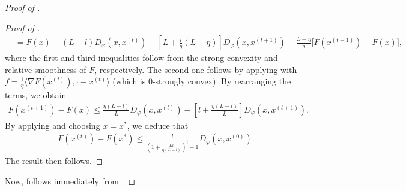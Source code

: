 \begin{proof}[Proof of ]
\begin{proof}[Proof of ]
\begin{align}
    &= F(x) + (L - l) D_{\varphi}(x, x^{(t)})
    - \left[ L + \frac{l}{\eta}(L - \eta) \right] D_{\varphi}(x, x^{(t+1)})
    - \frac{L - \eta}{\eta} \big[ F(x^{(t+1)}) - F(x) \big],
\end{align}
where the first and third inequalities follow from the strong convexity and
relative smoothness of $F$, respectively. The second one follows by applying
 with
$f = \frac{1}{\eta} \langle \nabla F(x^{(t)}), \cdot - x^{(t)} \rangle$
(which is $0$-strongly convex). By rearranging the terms, we obtain
\begin{align}
    F(x^{(t+1)}) - F(x) \leq \frac{\eta(L-l)}{L} D_{\varphi}(x, x^{(t)})
    - \left[ l + \frac{\eta (L - l)}{L} \right] D_{\varphi}(x, x^{(t+1)}).
\end{align}
By applying  and choosing $x = x^*$, we deduce that
\begin{align}
    F(x^{(t)}) - F(x^*) \leq \frac{l}{\left( 1 + \frac{Ll }{\eta (L - l)} \right)^t - 1}
    D_{\varphi}(x, x^{(0)}).
\end{align}
The result then follows.
\end{proof}
Now,  follows immediately from
.
\end{proof}
